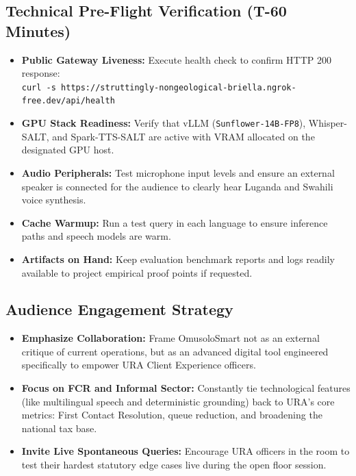 \documentclass[10pt,a4paper]{article}
\begin{document}
\subsection{Technical Pre-Flight Verification (T-60 Minutes)}
\begin{itemize}
  \item[\checkmark] \textbf{Public Gateway Liveness:} Execute health check to confirm HTTP 200 response:\\
  \texttt{curl -s https://struttingly-nongeological-briella.ngrok-free.dev/api/health}
  \item[\checkmark] \textbf{GPU Stack Readiness:} Verify that vLLM (\texttt{Sunflower-14B-FP8}), Whisper-SALT, and Spark-TTS-SALT are active with VRAM allocated on the designated GPU host.
  \item[\checkmark] \textbf{Audio Peripherals:} Test microphone input levels and ensure an external speaker is connected for the audience to clearly hear Luganda and Swahili voice synthesis.
  \item[\checkmark] \textbf{Cache Warmup:} Run a test query in each language to ensure inference paths and speech models are warm.
  \item[\checkmark] \textbf{Artifacts on Hand:} Keep evaluation benchmark reports and logs readily available to project empirical proof points if requested.
\end{itemize}

\subsection{Audience Engagement Strategy}
\begin{itemize}
  \item \textbf{Emphasize Collaboration:} Frame OmusoloSmart not as an external critique of current operations, but as an advanced digital tool engineered specifically to empower URA Client Experience officers.
  \item \textbf{Focus on FCR and Informal Sector:} Constantly tie technological features (like multilingual speech and deterministic grounding) back to URA's core metrics: First Contact Resolution, queue reduction, and broadening the national tax base.
  \item \textbf{Invite Live Spontaneous Queries:} Encourage URA officers in the room to test their hardest statutory edge cases live during the open floor session.
\end{itemize}
\end{document}
